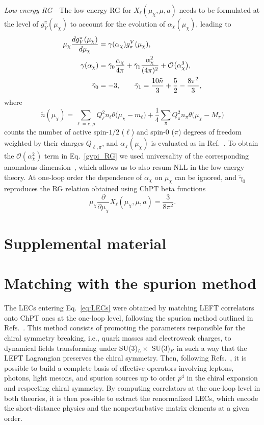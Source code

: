 \documentclass[prl,twocolumn,twoside,preprintnumbers,superscriptaddress,nofootinbib,letterpaper]{revtex4-1}
\newcommand{\Order}{\mathcal{O}}
\newcommand{\beq}{\begin{equation}}
\newcommand{\eeq}{\end{equation}}
\begin{document}
\emph{Low-energy RG}---The low-energy RG for $X_\ell(\mu_\chi,\mu,a)$ needs to be formulated at the level of $g_V^\pi(\mu_\chi)$ to account for the evolution of $\alpha_\chi(\mu_\chi)$, leading to
\begin{align}
\label{gvpi_RG}
\mu_\chi\frac{dg_V^\pi(\mu_\chi)}{d\mu_\chi}&=\gamma(\alpha_\chi)g_\pi^V(\mu_\chi),\notag\\
\gamma(\alpha_\chi)&=\tilde\gamma_0\frac{\alpha_\chi}{4\pi}+\tilde\gamma_1\frac{\alpha^2_\chi}{(4\pi)^2}+\Order\big(\alpha_\chi^3\big),\notag\\
\tilde\gamma_0&=-3,\qquad\tilde\gamma_1=\frac{10\tilde n}{3}+\frac{5}{2}-\frac{8\pi^2}{3},
\end{align}
where
\beq
\tilde n(\mu_\chi)=\sum_{\ell=e,\mu} Q_\ell^2 n_\ell\theta\big(\mu_\chi-m_\ell\big)+\frac{1}{4}\sum_\pi Q_\pi^2 n_\pi\theta\big(\mu_\chi-M_\pi)
\eeq
counts the number of active spin-$1/2$ ($\ell$) and spin-$0$ ($\pi$) degrees of freedom weighted by their charges $Q_{\ell,\pi}$, and $\alpha_\chi(\mu_\chi)$ is evaluated as in Ref.~\cite{Cirigliano:2023fnz}. To obtain the $\Order(\alpha_\chi^2)$ term in Eq.~\eqref{gvpi_RG} we used universality of the corresponding anomalous dimension~\cite{Borah:2024ghn,Ji:1991pr}, which allows us to also resum NLL in the low-energy theory. At one-loop order the dependence of $\alpha_\chi$ on $\mu_\chi$ can be ignored, and $\tilde\gamma_0$ reproduces the RG relation
obtained using ChPT beta functions~\cite{Knecht:1999ag,Urech:1994hd}
\beq
\mu_\chi\frac{\partial}{\partial\mu_\chi}X_\ell(\mu_\chi,\mu,a)=\frac{3}{8\pi^2}.
\eeq

\section{Supplemental material}

\appendix

\section{Matching  with  the spurion method}
\label{app:matching}


The LECs entering Eq.~\eqref{eq:LECs} were obtained by matching LEFT correlators onto ChPT ones at the one-loop level, following the spurion method outlined in Refs.~\cite{Descotes-Genon:2005wrq,Cirigliano:2023fnz}. This method consists of promoting the parameters responsible for the chiral symmetry breaking, i.e.,  quark masses and electroweak charges,
to dynamical fields transforming under SU(3)$_{L}\times$ SU(3)$_{R}$ in such a way that the LEFT Lagrangian preserves the chiral symmetry. Then, following Refs.~\cite{Urech:1994hd,Knecht:1999ag}, it is possible to build a complete basis of effective operators involving leptons, photons, light mesons, and spurion sources up to order $p^{4}$ in the chiral expansion and respecting  chiral symmetry.
By computing correlators at the one-loop level in both theories, it is then possible to extract the renormalized LECs, which encode the short-distance physics and the nonperturbative matrix elements at a given order.
\end{document}
